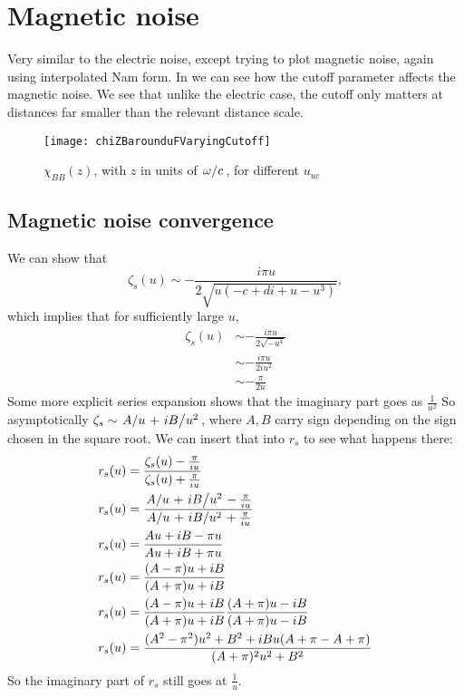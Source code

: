 \documentclass[11pt]{article}
\begin{document}
	\graphicspath{{figures/}}

	\section{Magnetic noise} \label{sec:intro}
	Very similar to the electric noise, except trying to plot magnetic noise, again using interpolated Nam form\supercite{Nam1967}.
	In  we can see how the cutoff parameter affects the magnetic noise.
	We see that unlike the electric case, the cutoff only matters at distances far smaller than the relevant distance scale.
	\begin{figure}[htp]
		\centering
		\texttt{[image: chiZBarounduFVaryingCutoff]}
		\caption{$\chi_{BB}(z)$, with $z$ in units of $\flatfrac{\omega}{c}$, for different $u_{uc}$} \label{fig:cutoff}
	\end{figure}

	\subsection{Magnetic noise convergence} \label{subsec:magneticnoiseconvergence}

	We can show that
	\begin{equation}
		\zeta_s(u) \sim - \frac{i \pi u}{2 \sqrt{u\left( - c + di + u - u^3 \right)}},
	\end{equation}
	which implies that for sufficiently large $u$,
	\begin{align}
		\zeta_s(u) &\sim - \frac{i \pi u}{2 \sqrt{- u^4}} \\
		&\sim - \frac{i \pi u}{2 i u^2} \\
		&\sim - \frac{\pi }{2 u}
	\end{align}
	Some more explicit series expansion shows that the imaginary part goes as $\frac{1}{u^2}$
	So asymptotically $\zeta_s \sim \flatfrac{A}{u} + \flatfrac{i B}{u^2}$, where $A, B$ carry sign depending on the sign chosen in the square root.
	We can insert that into $r_s$ to see what happens there:
	\begin{align}
		r_s(u) &= \frac{\zeta_s(u) - \frac{\pi}{iu }}{\zeta_s(u) + \frac{\pi}{iu}} \\
		r_s(u) &= \frac{\flatfrac{A}{u} + \flatfrac{i B}{u^2} - \frac{\pi}{iu}}{\flatfrac{A}{u} + \flatfrac{i B}{u^2} + \frac{\pi}{iu}} \\
		r_s(u) &= \frac{A u + i B - \pi u}{A u + i B + \pi u} \\
		r_s(u) &= \frac{(A - \pi) u + i B}{(A + \pi)u + i B } \\
		r_s(u) &= \frac{(A - \pi) u + i B}{(A + \pi)u + i B } \frac{{(A + \pi)u - i B }}{{(A + \pi)u - i B }} \\
		r_s(u) &= \frac{(A^2 - \pi^2) u^2 + B^2  + i B u(A + \pi - A + \pi)}{(A + \pi)^2 u^2 + B^2 }
	\end{align}
	So the imaginary part of $r_s$ still goes at $\frac{1}{u}$.
\end{document}
